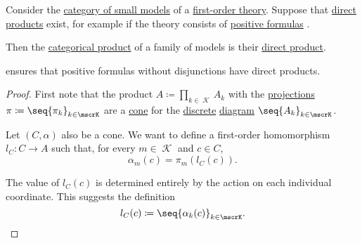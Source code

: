 \begin{proposition}\label{thm:first_order_direct_product_is_categorical_product}
  Consider the \hyperref[def:category_of_small_first_order_models]{category of small models} of a \hyperref[def:first_order_theory]{first-order theory}. Suppose that \hyperref[def:first_order_direct_product]{direct products} exist, for example if the theory consists of \hyperref[def:positive_formula]{positive formulas} .

  Then the \hyperref[def:discrete_category_limits]{categorical product} of a family of models is their \hyperref[def:first_order_direct_product]{direct product}.
\end{proposition}
\begin{comments}
  \item {} ensures that positive formulas without disjunctions have direct products.
\end{comments}
\begin{proof}
  First note that the product \( A \coloneqq \prod_{k \in \mscrK} A_k \) with the \hyperref[thm:direct_product_projections]{projections} \( \pi \coloneqq \seq{ \pi_k }_{k \in \mscrK} \) are a \hyperref[def:category_of_cones/cone]{cone} for the \hyperref[def:discrete_category]{discrete} \hyperref[def:categorical_diagram]{diagram} \( \seq{ A_k }_{k \in \mscrK} \).

  Let \( (C, \alpha) \) also be a cone. We want to define a first-order homomorphism \( l_C: C \to A \) such that, for every \( m \in \mscrK \) and \( c \in C \),
  \begin{equation*}
    \alpha_m(c) = \pi_m(l_C(c)).
  \end{equation*}

  The value of \( l_C(c) \) is determined entirely by the action on each individual coordinate. This suggests the definition
  \begin{equation*}
    l_C(c) \coloneqq \seq{ \alpha_k(c) }_{k \in \mscrK}.
  \end{equation*}
\end{proof}

